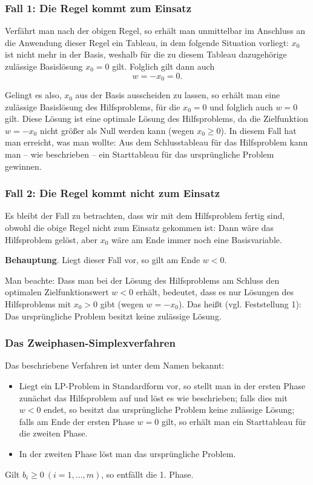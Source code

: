 \documentclass[smaller]{beamer}
\begin{document}
\begin{frame}
\frametitle{Fall 1: Die Regel kommt zum Einsatz}
Verfährt man nach der obigen Regel, so erhält man unmittelbar im Anschluss an die Anwendung dieser Regel ein Tableau, in dem folgende Situation vorliegt: $x_0$ ist nicht mehr in der Basis, weshalb für die zu diesem Tableau dazugehörige zulässige Basislösung $x_0=0$ gilt. Folglich gilt dann auch
\[
w = -x_0 = 0.
\]

\alert{Gelingt es also, $x_0$ aus der Basis ausscheiden zu lassen, so erhält man eine zulässige Basislösung des Hilfsproblems, für die $x_0 = 0$ und folglich auch $w=0$ gilt}. Diese Lösung ist eine \alert{optimale} Lösung des Hilfsproblems, da die Zielfunktion $w =-x_0$ nicht größer als Null werden kann (wegen $x_0 \geq 0$). \alert{In diesem Fall hat man erreicht, was man wollte}: Aus dem Schlusstableau für das Hilfsproblem kann man -- wie beschrieben -- ein {Starttableau} für das ursprüngliche Problem gewinnen.
 
\end{frame}

\begin{frame}
 \frametitle{Fall 2: Die Regel kommt nicht zum Einsatz}
 Es bleibt der Fall zu betrachten, dass wir mit dem Hilfsproblem fertig sind, obwohl die obige Regel nicht zum Einsatz gekommen ist: \alert{Dann wäre das Hilfsproblem gelöst, aber $x_0$ wäre am Ende immer noch eine Basisvariable}. \\ \vspace*{0.2cm}

 \textbf{Behauptung}. Liegt dieser Fall vor, so gilt am Ende $w<0$. \\ \vspace*{0.2cm}
 
 Man beachte: Dass man bei der Lösung des Hilfsproblems am Schluss den optimalen Zielfunktionswert $w<0$ erhält, bedeutet, dass es nur Lösungen des Hilfsproblems mit $x_0>0$ gibt (wegen $w=-x_0$). Das heißt (vgl. Feststellung 1): \alert{Das ursprüngliche Problem besitzt keine zulässige Lösung.}
\end{frame}

\begin{frame}
 \frametitle{Das Zweiphasen-Simplexverfahren}
 Das beschriebene Verfahren ist unter dem Namen  bekannt:
\begin{itemize}
\item Liegt ein \alert{LP-Problem in Standardform} vor, so stellt man in der \alert{ersten Phase} zunächst das Hilfsproblem auf und löst es wie beschrieben; falls dies mit $w<0$ endet, so besitzt das ursprüngliche Problem keine zulässige Lösung; falls am Ende der ersten Phase $w=0$ gilt, so erhält man ein \alert{Starttableau für die zweiten Phase}.
\item In der \alert{zweiten Phase} löst man das ursprüngliche Problem.
\end{itemize}

Gilt $b_i \geq 0\ (i=1,\ldots,m)$, so entfällt die 1. Phase.
\end{frame}
\end{document}
